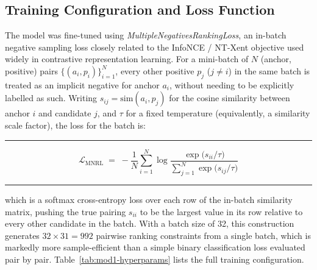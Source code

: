 \documentclass[11pt,a4paper]{article}
\newenvironment{formulabox}
  {\begin{center}\color{TPteal}\rule{0.92\linewidth}{0.8pt}\par\vspace{5pt}\color{TPnavy}}
  {\par\vspace{3pt}\color{TPteal}\rule{0.92\linewidth}{0.8pt}\end{center}}
\begin{document}
\subsection{Training Configuration and Loss Function}
\label{sec:mod1-training}

The model was fine-tuned using \emph{MultipleNegativesRankingLoss}, an in-batch negative sampling loss closely related to the InfoNCE / NT-Xent objective used widely in contrastive representation learning. For a mini-batch of $N$ (anchor, positive) pairs $\{(a_i, p_i)\}_{i=1}^{N}$, every other positive $p_j$ ($j \ne i$) in the same batch is treated as an implicit negative for anchor $a_i$, without needing to be explicitly labelled as such. Writing $s_{ij} = \mathrm{sim}(a_i, p_j)$ for the cosine similarity between anchor $i$ and candidate $j$, and $\tau$ for a fixed temperature (equivalently, a similarity scale factor), the loss for the batch is:

\begin{formulabox}
\begin{equation}
\label{eq:mnrl}
\mathcal{L}_{\mathrm{MNRL}} \;=\; -\frac{1}{N}\sum_{i=1}^{N} \log \frac{\exp\!\big(s_{ii}/\tau\big)}{\sum_{j=1}^{N}\exp\!\big(s_{ij}/\tau\big)}
\end{equation}
\end{formulabox}

which is a softmax cross-entropy loss over each row of the in-batch similarity matrix, pushing the true pairing $s_{ii}$ to be the largest value in its row relative to every other candidate in the batch. With a batch size of 32, this construction generates $32 \times 31 = 992$ pairwise ranking constraints from a single batch, which is markedly more sample-efficient than a simple binary classification loss evaluated pair by pair. Table~\ref{tab:mod1-hyperparams} lists the full training configuration.
\end{document}
